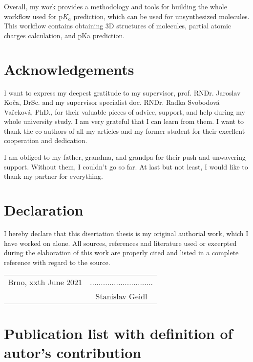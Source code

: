 \documentclass[11pt,b5paper,oneside,final]{book}
\begin{document}
Overall, my work provides a methodology and tools for building the whole
workflow used for p$K_a$ prediction, which can be used for unsynthesized
mo\-le\-cules. This workflow contains obtaining 3D structures of mo\-le\-cu\-les,
partial atomic charges calculation, and pKa prediction.

\clearpage

\vspace*{13cm}
\section*{Acknowledgements}
I want to express my deepest gratitude to my supervisor, prof. RNDr. Jaroslav
Ko\v{c}a, DrSc. and my supervisor specialist doc. RNDr. Radka Svobodov\'a Va\v{r}ekov\'a,
PhD., for their valuable pieces of advice, support, and help during my whole
university study. I am very grateful that I can learn from them. I want to
thank the co-authors of all my articles and my former student for their
excellent cooperation and dedication.

I am obliged to my father, grandma, and grandpa for their push and unwavering
support. Without them, I couldn't go so far. At last but not least, I would like
to thank my partner for everything.
\clearpage

\vspace*{13cm}
\section*{Declaration}
I hereby declare that this disertation thesis is my original authorial work,
which I have worked on alone. All sources, references and literature used or
excerpted during the elaboration of this work are properly cited and listed
in a complete reference with regard to the source.

\vspace{1cm}

\begin{tabular}{p{5cm}c}
Brno, xxth June 2021  & ............................. \\
                      & Stanislav Geidl \\
\end{tabular}
\clearpage

\section*{Publication list with definition of autor's contribution}
\end{document}
